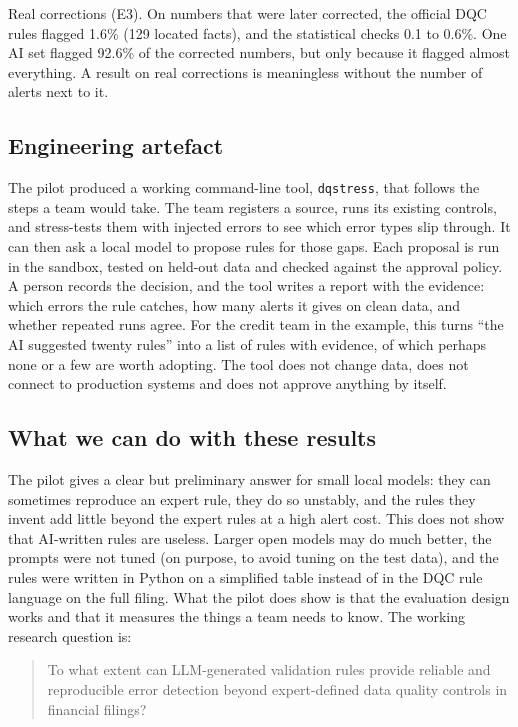 \documentclass[11pt,a4paper]{article}
\begin{document}
Real corrections (E3). On numbers that were later corrected, the official DQC rules flagged 1.6\% (129 located facts), and the statistical checks 0.1 to 0.6\%. One AI set flagged 92.6\% of the corrected numbers, but only because it flagged almost everything. A result on real corrections is meaningless without the number of alerts next to it.

\subsection{Engineering artefact}

The pilot produced a working command-line tool, \texttt{dqstress}, that follows the steps a team would take. The team registers a source, runs its existing controls, and stress-tests them with injected errors to see which error types slip through. It can then ask a local model to propose rules for those gaps. Each proposal is run in the sandbox, tested on held-out data and checked against the approval policy. A person records the decision, and the tool writes a report with the evidence: which errors the rule catches, how many alerts it gives on clean data, and whether repeated runs agree. For the credit team in the example, this turns ``the AI suggested twenty rules'' into a list of rules with evidence, of which perhaps none or a few are worth adopting. The tool does not change data, does not connect to production systems and does not approve anything by itself.

\subsection{What we can do with these results}

The pilot gives a clear but preliminary answer for small local models: they can sometimes reproduce an expert rule, they do so unstably, and the rules they invent add little beyond the expert rules at a high alert cost. This does not show that AI-written rules are useless. Larger open models may do much better, the prompts were not tuned (on purpose, to avoid tuning on the test data), and the rules were written in Python on a simplified table instead of in the DQC rule language on the full filing. What the pilot does show is that the evaluation design works and that it measures the things a team needs to know. The working research question is:

\begin{quote}
To what extent can LLM-generated validation rules provide reliable and reproducible error detection beyond expert-defined data quality controls in financial filings?
\end{quote}
\end{document}
